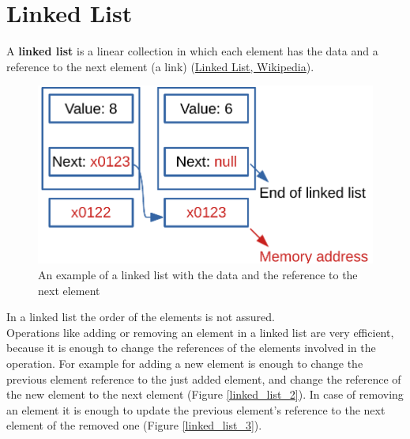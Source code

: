 \section{Linked List}
A \textbf{linked list} is a linear collection in which each element has the data and a reference to the next element (a link) \cite{wikilinkedlist} (\href{https://en.wikipedia.org/wiki/Linked_list}{Linked List, Wikipedia}). 
\begin{figure}[H]
	\begin{center}
		\includegraphics[scale=.6]{chapters/datastructures/images/linked_list_1.pdf}
		\caption[An example of a linked list with the data and the reference to the next element]{An example of a linked list with the data and the reference to the next element}
		\label{linked_list_1}
	\end{center}
\end{figure}
In a linked list the order of the elements is not assured. 
\\
Operations like adding or removing an element in a linked list are very efficient, because it is enough to change the references of the elements involved in the operation. For example for adding a new element is enough to change the previous element reference to the just added element, and change the reference of the new element to the next element (Figure \ref{linked_list_2}). In case of removing an element it is enough to update the previous element's reference to the next element of the removed one (Figure \ref{linked_list_3}). 
